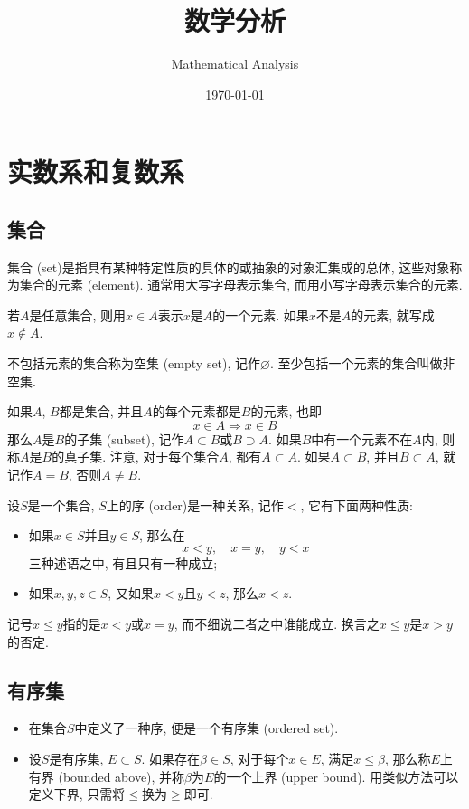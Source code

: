 \documentclass[cn,12pt,math=mtpro2,citestyle=gb7714-2015,bibstyle=gb7714-2015,twocol]{elegantbook}
\title{数学分析}
\subtitle{Mathematical Analysis}
\date{\today}
\let\emptyset\varnothing
\begin{document}
\maketitle
\frontmatter

\tableofcontents

\mainmatter

\chapter{实数系和复数系}
\section{集合}
\begin{definition}
集合 (set)是指具有某种特定性质的具体的或抽象的对象汇集成的总体, 这些对象称为集合的元素 (element). 通常用大写字母表示集合, 而用小写字母表示集合的元素.
\end{definition}

若$A$是任意集合, 则用$x\in A$表示$x$是$A$的一个元素. 如果$x$不是$A$的元素, 就写成$x \notin A$.

不包括元素的集合称为空集 (empty set), 记作$\emptyset$. 至少包括一个元素的集合叫做非空集.

如果$A$, $B$都是集合, 并且$A$的每个元素都是$B$的元素, 也即
$$x\in A\Rightarrow x\in B$$
那么$A$是$B$的子集 (subset), 记作$A \subset B$或$B \supset A$. 如果$B$中有一个元素不在$A$内, 则称$A$是$B$的真子集. 注意, 对于每个集合$A$, 都有$A\subset A$. 如果$A\subset B$, 并且$B\subset A$, 就记作$A=B$, 否则$A\neq B$.


\begin{definition}
设$S$是一个集合, $S$上的序 (order)是一种关系, 记作$<$, 它有下面两种性质:
\begin{itemize}
\item 如果$x \in S$并且$y\in S$, 那么在
$$x<y,\quad x=y, \quad y<x$$
三种述语之中, 有且只有一种成立;

\item 如果$x, y, z \in S$, 又如果$x<y$且$y<z$, 那么$x<z$.
\end{itemize}
\end{definition}

记号$x\leq y$指的是$x<y$或$x=y$, 而不细说二者之中谁能成立. 换言之$x\leq y$是$x>y$的否定.
\section{有序集}
\begin{definition}
\begin{itemize}
\item 在集合$S$中定义了一种序, 便是一个有序集 (ordered set).

\item 设$S$是有序集, $E\subset S$. 如果存在$\beta \in S$, 对于每个$x \in E$, 满足$x\leq \beta$, 那么称$E$上有界 (bounded above), 并称$\beta$为$E$的一个上界 (upper bound). 用类似方法可以定义下界, 只需将$\leq$换为$\geq$即可.
\end{itemize}
\end{definition}
\end{document}
